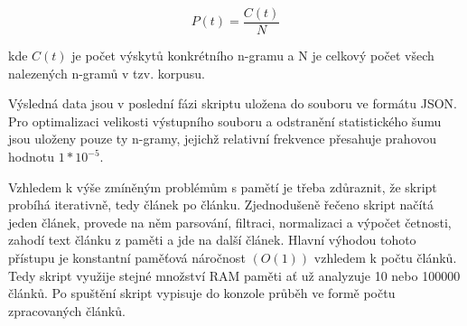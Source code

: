 \documentclass[a4paper, twoside, 12pt, czech]{article}
\begin{document}
\begin{equation*}
    P(t)=\frac{C(t)}{N}    
\end{equation*}


kde $C(t)$ je počet výskytů konkrétního n-gramu a N je celkový počet všech 
nalezených n-gramů v tzv. korpusu.

Výsledná data jsou v poslední fázi skriptu uložena do souboru ve formátu JSON. 
Pro optimalizaci velikosti výstupního souboru a odstranění statistického šumu 
jsou uloženy pouze ty n-gramy, jejichž relativní frekvence přesahuje prahovou 
hodnotu $1*10^{-5}$.

Vzhledem k výše zmíněným problémům s pamětí je třeba zdůraznit, že skript probíhá 
iterativně, tedy článek po článku. Zjednodušeně řečeno skript načítá jeden článek, 
provede na něm parsování, filtraci, normalizaci a výpočet četnosti, zahodí text 
článku z paměti a jde na další článek. Hlavní výhodou tohoto přístupu je 
konstantní paměťová náročnost $(O(1))$ vzhledem k počtu článků. Tedy skript 
využije stejné množství RAM paměti ať už analyzuje 10 nebo 100000 článků. Po 
spuštění skript vypisuje do konzole průběh ve formě počtu zpracovaných článků.

\end{document}
